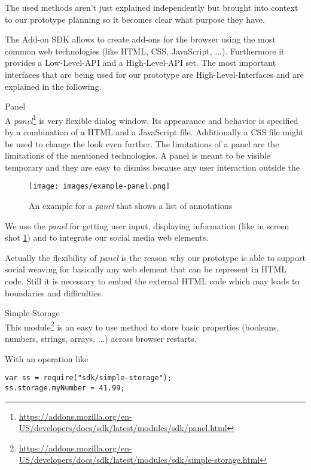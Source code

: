 The used methods aren't just explained independently but brought into context to our prototype planning so it becomes clear what purpose they have. 

The Add-on SDK allows to create add-ons for the browser using the most common web technologies (like HTML, CSS, JavaScript, ...). Furthermore it provides a Low-Level-API and a High-Level-API set. The most important interfaces that are being used for our prototype are High-Level-Interfaces and are explained in the following.

\begin{description}
\item Panel\\
A \emph{panel}\footnote{\url{https://addons.mozilla.org/en-US/developers/docs/sdk/latest/modules/sdk/panel.html}} is very flexible dialog window. Its appearance and behavior is specified by a combination of a HTML and a JavaScript file. Additionally a CSS file might be used to change the look even further. The limitations of a panel are the limitations of the mentioned technologies. 
A panel is meant to be visible temporary and they are easy to dismiss because any user interaction outside the 

\begin{figure}\centering
		\texttt{[image: images/example-panel.png]}
		\caption{An example for a \emph{panel} that shows a list of annotations}
		\label{example-panel}
\end{figure} 

We use the \emph{panel} for getting user input, displaying information (like in screen shot \ref{example-panel}) and to integrate our social media web elements. 

Actually the flexibility of \emph{panel} is the reason why our prototype is able to support social weaving for basically any web element that can be represent in HTML code. Still it is necessary to embed the external HTML code which may leads to boundaries and difficulties.

\item Simple-Storage\\
This module\footnote{\url{https://addons.mozilla.org/en-US/developers/docs/sdk/latest/modules/sdk/simple-storage.html}} is an easy to use method to store basic properties (booleans, numbers, strings, arrays, ...) across browser restarts. 

With an operation like

\begin{lstlisting}
var ss = require("sdk/simple-storage");
ss.storage.myNumber = 41.99;
\end{lstlisting}


\end{description}
